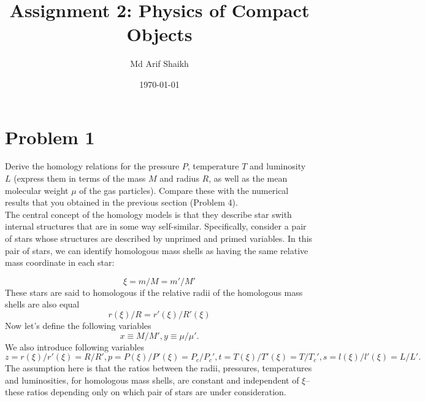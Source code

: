\documentclass{revtex4-2}
\begin{document}
\title{Assignment 2: Physics of Compact Objects}
\author{Md Arif Shaikh}
\date{\today}
\maketitle

\section*{Problem 1}
\label{sec:problem-1}
Derive the homology relations for the pressure $P$, temperature $T$ and luminosity $L$ (express them in terms of the mass $M$ and radius $R$, as well as the mean molecular weight $\mu$ of the gas particles). Compare these with the numerical results that you obtained in the previous section (Problem 4).\\

The central concept of the homology models is that they describe star swith internal structures that are in some way self-similar. Specifically, consider a pair of stars whose structures are described by unprimed and primed variables. In this pair of stars, we can identify homologous mass shells as having the same relative mass coordinate in each star:

\begin{equation}
  \label{eq:relative-mass-coordinate}
  \xi = m/M = m'/M'
\end{equation}
These stars are said to homologous if the relative radii of the homologous mass shells are also equal
\begin{equation}
  \label{eq:relative-radii}
  r(\xi)/R = r'(\xi)/R'(\xi)
\end{equation}
Now let's define the following variables
\begin{equation}
  \label{eq:mass-molecular-weight}
  x \equiv M/M', y \equiv \mu/\mu'.
\end{equation}
We also introduce following variables
\begin{equation}
  \label{eq:z-p-t-s}
  z = r(\xi)/r'(\xi) = R/R', p = P(\xi)/P'(\xi) = P_c/P_c', t = T(\xi)/T'(\xi)=T/T_c', s = l(\xi)/l'(\xi) = L/L'.
\end{equation}
The assumption here is that the ratios between the radii, pressures, temperatures and luminosities, for homologous mass shells, are constant and independent of $\xi$--these ratios depending only on which pair of stars are under consideration.
\end{document}
